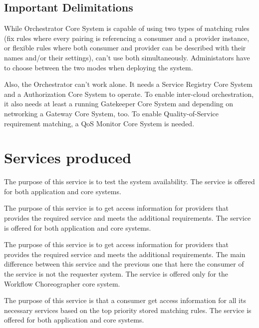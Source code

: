 \documentclass[a4paper]{arrowhead}
\begin{document}
\subsection{Important Delimitations}
\label{sec:delimitations}

While Orchestrator Core System is capable of using two types of matching rules (fix rules where every pairing is referencing a consumer and a provider instance, or flexible rules where both consumer and provider can be described with their names and/or their settings), can't use both simultaneously. Administators have to choose between the two modes when deploying the system.

Also, the Orchestrator can't work alone. It needs a Service Registry Core System and a Authorization Core System to operate. To enable inter-cloud orchestration, it also needs at least a running Gatekeeper Core System and depending on networking a Gateway Core System, too. To enable Quality-of-Service requirement matching, a QoS Monitor Core System is needed.

\newpage

\section{Services produced}
\label{sec:services}

The purpose of this service is to test the system availability. The service is offered for both application and core systems. 

The purpose of this service is to get access information for providers that provides the required service and meets the additional requirements. The service is offered for both application and core systems. 

The purpose of this service is to get access information for providers that provides the required service and meets the additional requirements. The main difference between this service and the previous one that here the consumer of the service is not the requester system. The service is offered only for the Workflow Choreographer core system. 

The purpose of this service is that a consumer get access information for all its necessary services based on the top priority stored matching rules. The service is offered for both application and core systems.
\end{document}
